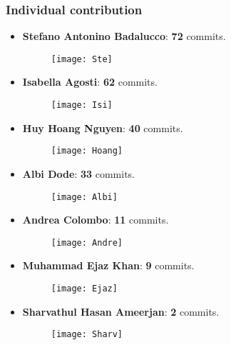 \subsubsection*{Individual contribution}
\begin{itemize}
	\item \textbf{Stefano Antonino Badalucco}: \textbf{72} commits.
	\begin{figure}[H]
		\centering
		\texttt{[image: Ste]}
	\end{figure}
\item \textbf{Isabella Agosti}: \textbf{62} commits.
\begin{figure}[H]
	\centering
	\texttt{[image: Isi]}
\end{figure}
\newpage
\item \textbf{Huy Hoang Nguyen}: \textbf{40} commits.
\begin{figure}[H]
	\centering
	\texttt{[image: Hoang]}
\end{figure}
\item \textbf{Albi Dode}: \textbf{33} commits.
\begin{figure}[H]
	\centering
	\texttt{[image: Albi]}
\end{figure}
\item \textbf{Andrea Colombo}: \textbf{11} commits.
\begin{figure}[H]
	\centering
	\texttt{[image: Andre]}
\end{figure}
\item \textbf{Muhammad Ejaz Khan}: \textbf{9} commits.
\begin{figure}[H]
	\centering
	\texttt{[image: Ejaz]}
\end{figure}
\item \textbf{Sharvathul Hasan Ameerjan}: \textbf{2} commits.
\begin{figure}[H]
	\centering
	\texttt{[image: Sharv]}
\end{figure}
\end{itemize}
